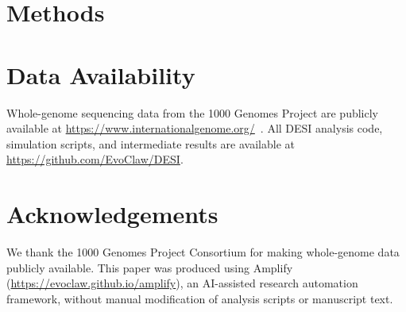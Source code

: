 \documentclass[12pt]{article}
\begin{document}


\section*{Methods}


\section*{Data Availability}

Whole-genome sequencing data from the 1000 Genomes Project are publicly available at \url{https://www.internationalgenome.org/}~\citep{Byrska2022}. All DESI analysis code, simulation scripts, and intermediate results are available at \url{https://github.com/EvoClaw/DESI}.

\section*{Acknowledgements}

We thank the 1000 Genomes Project Consortium for making whole-genome data publicly available. This paper was produced using Amplify (\url{https://evoclaw.github.io/amplify}), an AI-assisted research automation framework, without manual modification of analysis scripts or manuscript text.




\clearpage
\appendix

\end{document}
